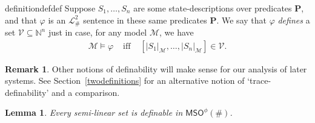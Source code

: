 \documentclass[12pt,oneside,reqno]{amsart}
\newtheorem{lemma}{Lemma}
\theoremstyle{definition}
\newtheorem{remark}{Remark}
\begin{document}
\begin{restatable}{definition}{defdef} \label{define:define}%
Suppose $S_1,\dots,S_n$ are some state-descriptions over predicates $\mathbf{P}$, and that $\varphi$ is an $\mathcal{L}_\#^2$ sentence in these same predicates $\mathbf{P}$. We say that $\varphi$ \emph{defines} a set $\mathcal{V} \subseteq \mathbb{N}^n$ just in case, for any model $\mathcal{M}$, we have \begin{eqnarray}
  \mathcal{M} \vDash \varphi & \mbox{ iff } & [|S_1|_{\mathcal{M}},\dots,|S_n|_{\mathcal{M}}] \in \mathcal{V}. \label{eq:df}
\end{eqnarray}
\end{restatable}
\begin{remark} Other notions of definability will make sense for our analysis of later systems. See Section~\ref{twodefinitions} for an alternative notion of `trace-definability' and a comparison.

\end{remark}
\begin{lemma} Every semi-linear set is definable in $\mathsf{MSO}^\phi(\#)$. \label{lemma:semi-linear}
\end{lemma}
\end{document}
